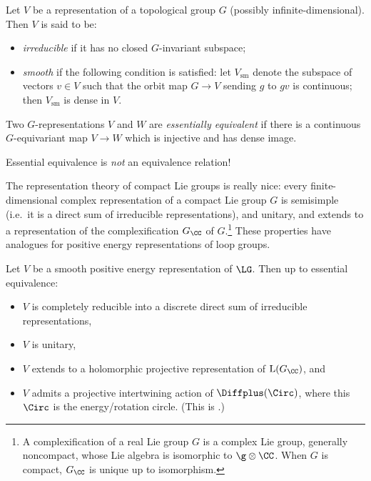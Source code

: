 \begin{definition}
	Let $V$ be a representation of a topological group $G$ (possibly
	infinite-dimensional). Then $V$ is said to be:
	\begin{itemize}
	\item \emph{irreducible} if it has no closed $G$-invariant subspace;
	\item \emph{smooth} if the following condition is satisfied: let
		$V_\mathrm{sm}$ denote the subspace of vectors $v\in V$ such that
		the orbit map $G\to V$ sending $g$ to $gv$ is continuous; then
		$V_\mathrm{sm}$ is dense in $V$.
	\end{itemize}
	Two $G$-representations $V$ and $W$ are \emph{essentially equivalent} if
	there is a continuous $G$-equivariant map $V\to W$ which is injective and
	has dense image.
\end{definition}

\begin{warning}
	Essential equivalence is \emph{not} an equivalence relation!
\end{warning}

The representation theory of compact Lie groups is really nice: every finite-dimensional complex representation of
a compact Lie group $G$ is semisimple (i.e.\ it is a direct sum of irreducible
representations), and unitary, and extends to a representation of the
complexification $G_\CC$ of $G$.\footnote{A complexification of a real Lie group $G$ is a complex Lie group,
generally noncompact, whose Lie algebra is isomorphic to $\g\otimes\CC$. When $G$ is compact, $G_\CC$ is unique up
to isomorphism.} These properties have analogues for positive energy
representations of loop groups.

\begin{theorem}
\label{like_cpt_Lie}
	Let $V$ be a smooth positive energy representation of $\LG$. Then up to
	essential equivalence:
	\begin{itemize}
	\item $V$ is completely reducible into a discrete direct sum of
		irreducible representations,
	\item $V$ is unitary,
	\item $V$ extends to a holomorphic projective representation of
		$\mathrm L(G_\CC)$, and
	\item $V$ admits a projective intertwining action of $\Diffplus(\Circ)$,
		where this $\Circ$ is the energy/rotation circle. (This is .)
	\end{itemize}
\end{theorem}

